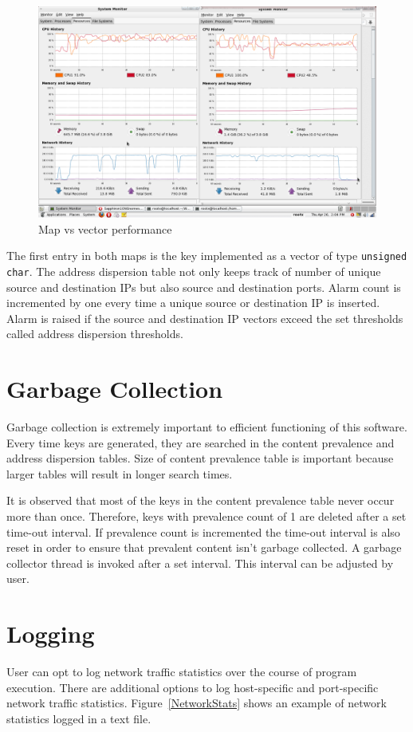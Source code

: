 \documentclass{report}
\begin{document}
\begin{figure}[here]
\centering
\includegraphics[width=\textwidth]{MapVsVector.png}
\caption{Map vs vector performance}
\label{MapVsVector}
\end{figure}

The first entry in both maps is the key implemented as a vector of type \texttt{unsigned char}. The address dispersion table not only keeps track of number of unique source and destination IPs but also source and destination ports. Alarm count is incremented by one every time a unique source or destination IP is inserted. Alarm is raised if the source and destination IP vectors exceed the set thresholds called address dispersion thresholds.

\section{Garbage Collection}
Garbage collection is extremely important to efficient functioning of this software. Every time keys are generated, they are searched in the content prevalence and address dispersion tables. Size of content prevalence table is important because larger tables will result in longer search times.

It is observed that most of the keys in the content prevalence table never occur more than once. Therefore, keys with prevalence count of 1 are deleted after a set time-out interval. If prevalence count is incremented the time-out interval is also reset in order to ensure that prevalent content isn't garbage collected. A garbage collector thread is invoked after a set interval. This interval can be adjusted by user.

\section{Logging}
User can opt to log network traffic statistics over the course of program execution. There are additional options to log host-specific and port-specific network traffic statistics. Figure~\ref{NetworkStats} shows an example of network statistics logged in a text file.
\end{document}
